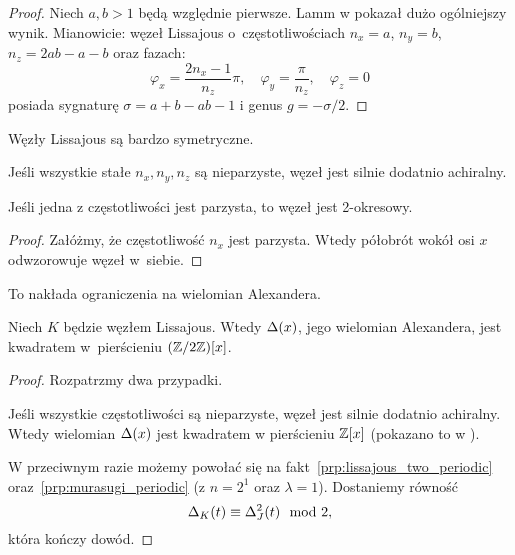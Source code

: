 \begin{proof}
    Niech $a, b > 1$ będą względnie pierwsze.
    Lamm w \cite{lamm97} pokazał dużo ogólniejszy wynik.
    Mianowicie: węzeł Lissajous o~częstotliwościach $n_x = a$, $n_y = b$, $n_z = 2ab-a-b$ oraz fazach:
    \begin{equation}
        \varphi_x = \frac{2n_x-1}{n_z} \pi, \quad
        \varphi_y = \frac{\pi}{n_z}, \quad
        \varphi_z = 0
    \end{equation}
    posiada sygnaturę $\sigma = a+b-ab-1$ i genus $g = -\sigma/2$.
%
%
\end{proof}

Węzły Lissajous są bardzo symetryczne.

\begin{proposition}
    Jeśli wszystkie stałe $n_x, n_y, n_z$ są nieparzyste, węzeł jest silnie dodatnio achiralny.
\end{proposition}

\begin{proposition}
%
\label{prp:lissajous_two_periodic}%
    Jeśli jedna z częstotliwości jest parzysta, to węzeł jest 2-okresowy.
\end{proposition}

\begin{proof}
    Załóżmy, że częstotliwość $n_x$ jest parzysta.
    Wtedy półobrót wokół osi $x$ odwzorowuje węzeł w~siebie.
\end{proof}

To nakłada ograniczenia na wielomian Alexandera.

\begin{proposition}
\label{prp:lissajous_alexander}%
    Niech $K$ będzie węzłem Lissajous.
    Wtedy $\Delta(x)$, jego wielomian Alexandera, jest kwadratem w~pierścieniu $(\mathbb Z/2\mathbb Z)[x]$.
\end{proposition}

\begin{proof}
    Rozpatrzmy dwa przypadki.

    Jeśli wszystkie częstotliwości są nieparzyste, węzeł jest silnie dodatnio achiralny.
    Wtedy wielomian $\Delta(x)$ jest kwadratem w pierścieniu $\mathbb Z[x]$ (pokazano to w \cite{hartley79}).

    W przeciwnym razie możemy powołać się na fakt~\ref{prp:lissajous_two_periodic} oraz~\ref{prp:murasugi_periodic} (z $n=2^1$ oraz $\lambda = 1$).
    Dostaniemy równość
    \begin{equation}
\label{eqn:lissajous_squared}%
        \alexander_K(t) \equiv \alexander^2_{J}(t) \mod 2,
    \end{equation}
    która kończy dowód.
\end{proof}

